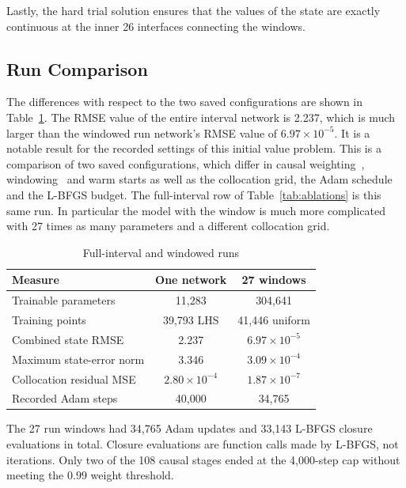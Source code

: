 \documentclass[conference]{IEEEtran}
\begin{document}
Lastly, the hard trial solution ensures that the values of the state are exactly continuous at the inner 26 interfaces connecting the windows.


\subsection{Run Comparison}
The differences with respect to the two saved configurations are shown in Table~\ref{tab:comparison}. The RMSE value of the entire interval network is 2.237, which is much larger than the windowed run network's RMSE value of $6.97\times10^{-5}$. It is a notable result for the recorded settings of this initial value problem. This is a comparison of two saved configurations, which differ in causal weighting~\cite{wang2024causal}, windowing~\cite{penwarden2023} and warm starts as well as the collocation grid, the Adam schedule and the L-BFGS budget. The full-interval row of Table~\ref{tab:ablations} is this same run. In particular the model with the window is much more complicated with 27 times as many parameters and a different collocation grid.

\begin{table}[t]
\caption{Full-interval and windowed runs}
\label{tab:comparison}
\centering\footnotesize
\begin{tabular}{lcc}
\toprule
Measure & One network & 27 windows\\
\midrule
Trainable parameters & 11,283 & 304,641\\
Training points & 39,793 LHS & 41,446 uniform\\
Combined state RMSE & 2.237 & $6.97\times10^{-5}$\\
Maximum state-error norm & 3.346 & $3.09\times10^{-4}$\\
Collocation residual MSE & $2.80\times10^{-4}$ & $1.87\times10^{-7}$\\
Recorded Adam steps & 40,000 & 34,765\\
\bottomrule
\end{tabular}
\end{table}

The 27 run windows had 34,765 Adam updates and 33,143 L-BFGS closure evaluations in total. Closure evaluations are function calls made by L-BFGS, not iterations. Only two of the 108 causal stages ended at the 4,000-step cap without meeting the $0.99$ weight threshold.
\end{document}
